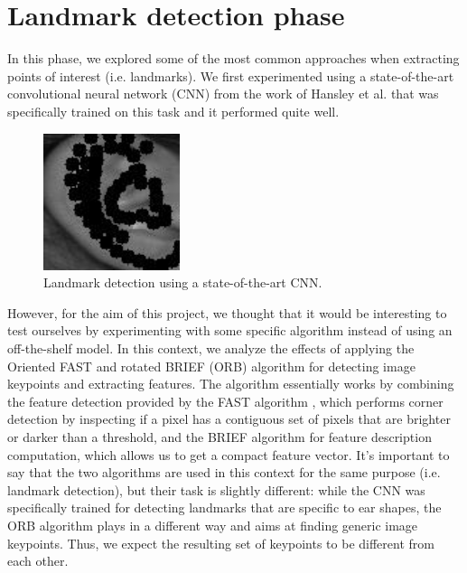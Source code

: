 \documentclass{article}
\begin{document}
\section{Landmark detection phase}

In this phase, we explored some of the most common approaches when extracting points
of interest (i.e. landmarks). We first experimented using a state-of-the-art convolutional neural network
(CNN) from the work of Hansley et al. that was specifically trained on this task and it performed quite well.

\begin{figure}[h]
    \label{fig:landmark}
    \begin{center}
        \includegraphics[width=4cm,keepaspectratio]{images/landmark.jpeg}
        \caption{Landmark detection using a state-of-the-art CNN.}
    \end{center}
\end{figure}

However, for the aim of this project, we thought that it would be interesting to test ourselves
by experimenting with some specific algorithm instead of using an off-the-shelf model. In this context,
we analyze the effects of applying the Oriented FAST and rotated BRIEF (ORB) algorithm \cite{conf/iccv/RubleeRKB11}
for detecting
image keypoints and extracting features. The algorithm essentially works by combining the feature detection
provided by the FAST algorithm \cite{rosten_2006_machine}, which performs corner detection by inspecting if a pixel
has a contiguous
set of pixels that are brighter or darker than a threshold, and the BRIEF algorithm \cite{Calonder:2010:BBR:1888089.1888148}
for feature description
computation, which allows us to get a compact feature vector. It's important to say that the two
algorithms are used in this context for the same purpose (i.e. landmark detection), but their task is
slightly different: while the CNN was specifically trained for detecting landmarks that are specific to ear
shapes, the ORB algorithm plays in a different way and aims at finding generic image keypoints. Thus,
we expect the resulting set of keypoints to be different from each other.
\end{document}
